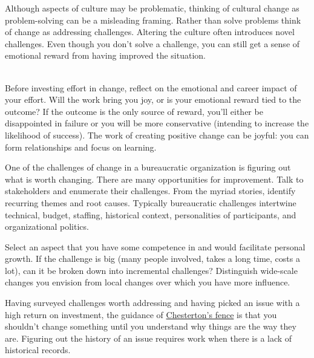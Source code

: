 Although aspects of culture may be problematic, thinking of cultural change as problem-solving can be a misleading framing. Rather than solve problems think of change as addressing challenges. %
Altering the culture often introduces novel challenges.
Even though you don't solve a challenge, you can still get a sense of emotional reward from having improved the situation. 

\ \\

Before investing effort in change, reflect on the emotional and career impact of your effort. Will the work bring you joy, or is your emotional reward tied to the outcome? If the outcome is the only source of reward, you'll either be disappointed in failure or you will be more conservative (intending to increase the likelihood of success). The work of creating positive change can be joyful: you can form relationships and focus on learning. 

One of the challenges of change in a bureaucratic organization is figuring out what is worth changing. There are many opportunities for improvement. Talk to stakeholders and enumerate their challenges.
%
%
From the myriad stories, identify recurring themes and root causes. Typically bureaucratic challenges intertwine technical, budget, staffing, historical context, personalities of participants, and organizational politics. 

Select an aspect that you have some competence in and would facilitate personal growth. If the challenge is big (many people involved, takes a long time, costs a lot), can it be broken down into incremental challenges? Distinguish wide-scale changes you envision from local changes over which you have more influence.

Having surveyed challenges worth addressing and having picked an issue with a high return on investment, the guidance of
\href{https://en.wikipedia.org/wiki/G._K._Chesterton\%23Chesterton\%27s_fence}{Chesterton's fence}
%
%
%
\iftoggle{haspagenumbers}{(page~\pageref{concept:chestertons_fence})}{section~\ref{concept:chestertons_fence}} 
is that you shouldn't change something until you understand why things are the way they are. Figuring out the history of an issue requires work when there is a lack of historical records.

